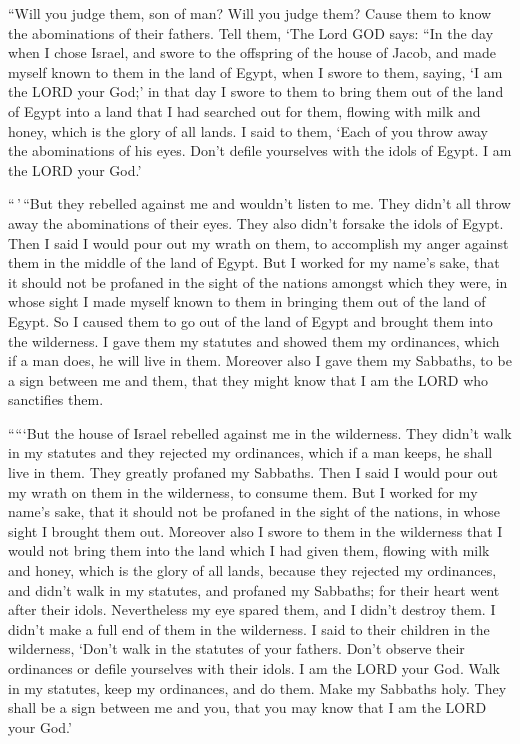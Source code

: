  ``Will you judge them, son of man? Will you judge them?
Cause them to know the abominations of their fathers.  Tell
them, `The Lord GOD says: ``In the day when I chose Israel, and swore to
the offspring of the house of Jacob, and made myself known to them in
the land of Egypt, when I swore to them, saying, `I am the LORD your
God;'  in that day I swore to them to bring them out of the
land of Egypt into a land that I had searched out for them, flowing with
milk and honey, which is the glory of all lands.  I said to
them, `Each of you throw away the abominations of his eyes. Don't defile
yourselves with the idols of Egypt. I am the LORD your God.'

 ``\,'\,``But they rebelled against me and wouldn't listen
to me. They didn't all throw away the abominations of their eyes. They
also didn't forsake the idols of Egypt. Then I said I would pour out my
wrath on them, to accomplish my anger against them in the middle of the
land of Egypt.  But I worked for my name's sake, that it
should not be profaned in the sight of the nations amongst which they
were, in whose sight I made myself known to them in bringing them out of
the land of Egypt.  So I caused them to go out of the land
of Egypt and brought them into the wilderness.  I gave them
my statutes and showed them my ordinances, which if a man does, he will
live in them.  Moreover also I gave them my Sabbaths, to be
a sign between me and them, that they might know that I am the LORD who
sanctifies them.

 `````But the house of Israel rebelled against me in the
wilderness. They didn't walk in my statutes and they rejected my
ordinances, which if a man keeps, he shall live in them. They greatly
profaned my Sabbaths. Then I said I would pour out my wrath on them in
the wilderness, to consume them.  But I worked for my
name's sake, that it should not be profaned in the sight of the nations,
in whose sight I brought them out.  Moreover also I swore
to them in the wilderness that I would not bring them into the land
which I had given them, flowing with milk and honey, which is the glory
of all lands,  because they rejected my ordinances, and
didn't walk in my statutes, and profaned my Sabbaths; for their heart
went after their idols.  Nevertheless my eye spared them,
and I didn't destroy them. I didn't make a full end of them in the
wilderness.  I said to their children in the wilderness,
`Don't walk in the statutes of your fathers. Don't observe their
ordinances or defile yourselves with their idols.  I am the
LORD your God. Walk in my statutes, keep my ordinances, and do them.
 Make my Sabbaths holy. They shall be a sign between me and
you, that you may know that I am the LORD your God.'

